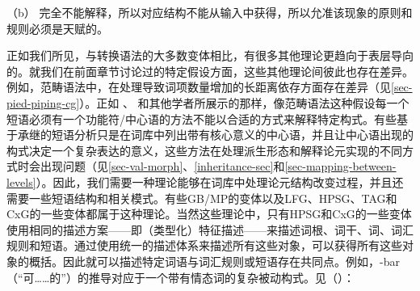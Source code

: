 \zl

\noindent
（b） 完全不能解释，所以对应结构不能从输入中获得，所以允准该现象的原则和规则必须是天赋的。

正如我们所见，与转换语法的大多数变体相比，有很多其他理论更趋向于表层导向的。就我们在前面章节讨论过的特定假设方面，这些其他理论间彼此也存在差异。例如，范畴语法中，在处理导致词项数量增加的长距离依存方面存在差异（见\ref{sec-pied-piping-cg}）。正如 \citet{Jacobs2008a}、 \citet{Jackendoff2008a}和其他学者所展示的那样，像范畴语法这种假设每一个短语必须有一个功能符/中心语的方法不能以合适的方式来解释特定构式。有些基于承继的短语分析只是在词库中列出带有核心意义的中心语，并且让中心语出现的构式决定一个复杂表达的意义，这些方法在处理派生形态和解释论元实现的不同方式时会出现问题（见\ref{sec-val-morph}、\ref{inheritance-sec}和\ref{sec-mapping-between-levels}）。因此，我们需要一种理论能够在词库中处理论元结构改变过程，并且还需要一些短语结构和相关模式。有些GB/MP的变体以及LFG、HPSG、TAG和CxG的一些变体都属于这种理论。当然这些理论中，只有HPSG和CxG的一些变体使用相同的描述方案——即（类型化）特征描述——来描述词根、词干、词、词汇规则和短语。通过使用统一的描述体系来描述所有这些对象，可以获得所有这些对象的概括。因此就可以描述特定词语与词汇规则或短语存在共同点。例如，-bar（“可……的”）的推导对应于一个带有情态词的复杂被动构式。见（）：
